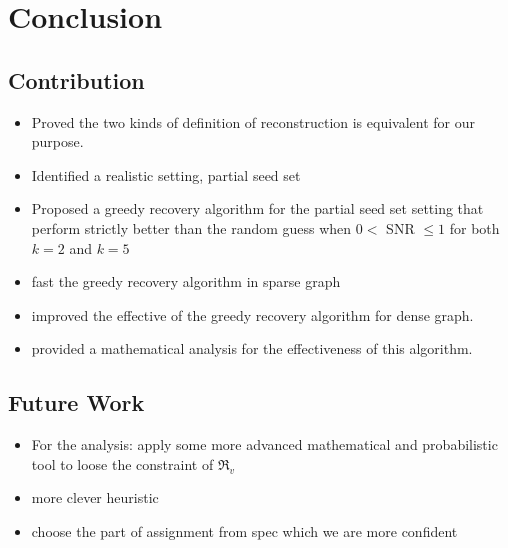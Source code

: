 \chapter{Conclusion}
\section{Contribution}
\begin{itemize}
    \item Proved the two kinds of definition of reconstruction is equivalent for our purpose.
    \item Identified a realistic setting, partial seed set
    \item Proposed a greedy recovery algorithm for the partial seed set setting that perform strictly better than the random guess when $0<$ SNR $\leq1$ for both $k=2$ and $k=5$
    \item fast the greedy recovery algorithm in sparse graph
    \item improved the effective of the greedy recovery algorithm for dense graph.
    \item provided a mathematical analysis for the effectiveness of this algorithm.
\end{itemize}

\section{Future Work}
\begin{itemize}
    \item For the analysis: apply some more advanced mathematical and probabilistic tool to loose the constraint of $\Re_v$
    \item more clever heuristic
    \item  choose the part of assignment from spec which we are more confident
\end{itemize}